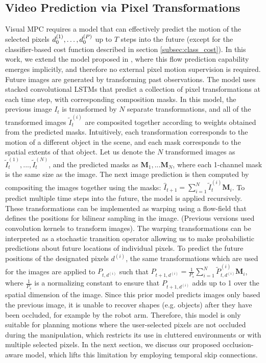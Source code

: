 \subsection{Video Prediction via Pixel Transformations}
\label{sec:model}
Visual MPC requires a model that can effectively predict the motion of the selected pixels $d_0^{(1)}, \dots, d_0^{(P)}$ up to $T$ steps into the future (except for the classifier-based cost function described in section \ref{subsec:class_cost}).
In this work, we extend the model proposed in \cite{finn_nips}, where this flow prediction capability emerges implicitly, and therefore no external pixel motion supervision is required. Future images are generated by transforming past observations. The model uses stacked convolutional LSTMs that predict a collection of pixel transformations at each time step, with corresponding composition masks. In this model, the previous image $I_t$ is transformed by $N$ separate transformations, and all of the transformed images $\tilde{I}_t^{(i)}$ are composited together according to weights obtained from the predicted masks. Intuitively, each transformation corresponds to the motion of a different object in the scene, and each mask corresponds to the spatial extents of that object. Let us denote the $N$ transformed images as $\tilde{I}_t^{(1)}, ..., \tilde{I}_t^{(N)}$, and the predicted masks as $\mathbf{M}_1, ...\mathbf{M}_N$, where each 1-channel mask is the same size as the image. The next image prediction is then computed by compositing the images together using the masks: $\hat{I}_{t+1} = \sum_{i=1}^N \tilde{I}_t^{(i)} \mathbf{M}_i$. To predict multiple time steps into the future, the model is applied recursively. These transformations can be implemented as warping using a flow-field that defines the positions for bilinear sampling in the image. (Previous versions used convolution kernels to transform images). The warping transformations can be interpreted as a stochastic transition operator allowing us to make probabilistic predictions about future locations of individual pixels. To predict the future positions of the designated pixels $d^{(i)}$, the same transformations which are used for the images are applied to $P_{t,d^{(i)}}$ such that $P_{t+1,d^{(i)}} = \frac{1}{P_s}\sum_{i=1}^N \tilde P^{(i)}_{t,d^{(i)}} \mathbf{M}_i $, where $\frac{1}{P_s}$ is a normalizing constant to ensure that $P_{t+1,d^{(i)}}$ adds up to 1 over the spatial dimension of the image. Since this prior model predicts images only based the previous image, it is unable to recover shapes (e.g. objects) after they have been occluded, for example by the robot arm. Therefore, this model is only suitable for planning motions where the user-selected pixels are not occluded during the manipulation, which restricts its use in cluttered environments or with multiple selected pixels. In the next section, we discuss our proposed occlusion-aware model, which lifts this limitation by employing temporal skip connections.

